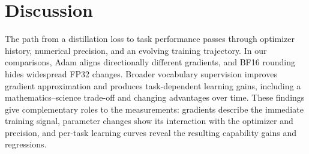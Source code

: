 \section{Discussion}

The path from a distillation loss to task performance passes through optimizer history, numerical precision, and an evolving training trajectory. In our comparisons, Adam aligns directionally different gradients, and BF16 rounding hides widespread FP32 changes. Broader vocabulary supervision improves gradient approximation and produces task-dependent learning gains, including a mathematics--science trade-off and changing advantages over time. These findings give complementary roles to the measurements: gradients describe the immediate training signal, parameter changes show its interaction with the optimizer and precision, and per-task learning curves reveal the resulting capability gains and regressions.
